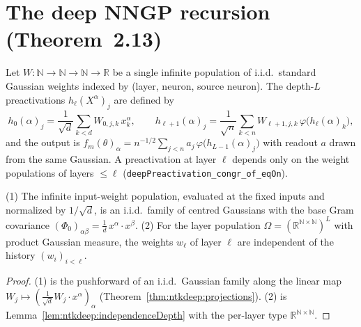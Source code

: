 \section{The deep NNGP recursion (Theorem~2.13)}\label{sec:ntkdeep:deep}

\begin{definition}\label{def:ntkdeep:deepPreactivation}
  \leanok
Let $W:\mathbb N\to\mathbb N\to\mathbb N\to\mathbb R$ be a single infinite population of i.i.d.\ standard Gaussian weights indexed by (layer, neuron, source neuron). The depth-$L$ preactivations $h_\ell(X^\alpha)_j$ are defined by
\[
  h_0(\alpha)_j=\frac1{\sqrt d}\sum_{k<d}W_{0,j,k}\,x^\alpha_k,\qquad
  h_{\ell+1}(\alpha)_j=\frac1{\sqrt n}\sum_{k<n}W_{\ell+1,j,k}\,\varphi\bigl(h_\ell(\alpha)_k\bigr),
\]
and the output is $f_m(\theta)_\alpha=n^{-1/2}\sum_{j<n}a_j\,\varphi\bigl(h_{L-1}(\alpha)_j\bigr)$ with readout $a$ drawn from the same Gaussian. A preactivation at layer $\ell$ depends only on the weight populations of layers $\le\ell$
(\texttt{deepPreactivation\_congr\_of\_eqOn}).
\end{definition}

\begin{lemma}\label{lem:ntkdeep:deepIndependence}
  \leanok
(1) The infinite input-weight population, evaluated at the fixed inputs and normalized by $1/\sqrt d$, is an i.i.d.\ family of centred Gaussians with the base Gram covariance $(\Phi_0)_{\alpha\beta}=\frac1d\,x^\alpha\cdot x^\beta$.
(2) For the layer population $\Omega=(\mathbb R^{\mathbb N\times\mathbb N})^L$ with product Gaussian measure, the weights $w_\ell$ of layer $\ell$ are independent of the history $(w_i)_{i<\ell}$.
\end{lemma}

\begin{proof}
  \leanok
(1) is the pushforward of an i.i.d.\ Gaussian family along the linear map $W_j\mapsto(\frac1{\sqrt d}W_j\cdot x^\alpha)_\alpha$ (Theorem~\ref{thm:ntkdeep:projections}). (2) is Lemma~\ref{lem:ntkdeep:independenceDepth} with the per-layer type $\mathbb R^{\mathbb N\times\mathbb N}$.
\end{proof}

